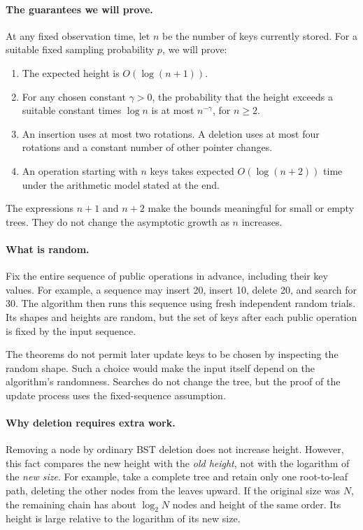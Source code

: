 \documentclass[11pt,a4paper]{article}
\theoremstyle{readable}
\begin{document}
\paragraph{The guarantees we will prove.}
At any fixed observation time, let $n$ be the number of keys currently
stored. For a suitable fixed sampling probability $p$, we will prove:
\begin{enumerate}
  \item The expected height is $O(\log(n+1))$.
  \item For any chosen constant $\gamma>0$, the probability that the
        height exceeds a suitable constant times $\log n$ is at most
        $n^{-\gamma}$, for $n\ge2$.
  \item An insertion uses at most two rotations. A deletion uses at
        most four rotations and a constant number of other pointer changes.
  \item An operation starting with $n$ keys takes expected
        $O(\log(n+2))$ time under the arithmetic model stated at the end.
\end{enumerate}
The expressions $n+1$ and $n+2$ make the bounds meaningful for small or
empty trees. They do not change the asymptotic growth as $n$ increases.

\paragraph{What is random.}
Fix the entire sequence of public operations in advance, including their
key values. For example, a sequence may insert 20, insert 10, delete 20,
and search for 30. The algorithm then runs this sequence using fresh
independent random trials. Its shapes and heights are random, but the
set of keys after each public operation is fixed by the input sequence.

The theorems do not permit later update keys to be chosen by inspecting
the random shape. Such a choice would make the input itself depend on
the algorithm's randomness. Searches do not change the tree, but the
proof of the update process uses the fixed-sequence assumption.

\paragraph{Why deletion requires extra work.}
Removing a node by ordinary BST deletion does not increase height.
However, this fact compares the new height with the \emph{old height},
not with the logarithm of the \emph{new size}. For example, take a
complete tree and retain only one root-to-leaf path, deleting the other
nodes from the leaves upward. If the original size was $N$, the remaining
chain has about $\log_2 N$ nodes and height of the same order. Its height
is large relative to the logarithm of its new size.
\end{document}
